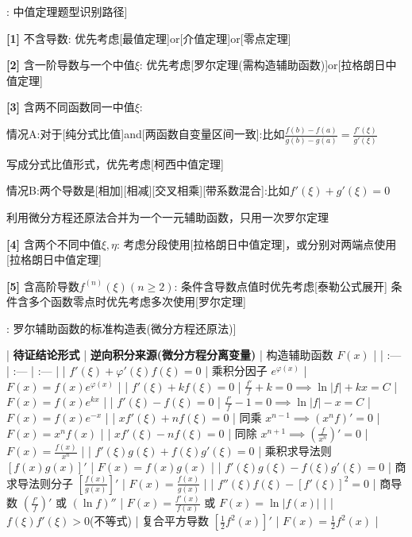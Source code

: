 \documentclass[11pt,a4paper,UTF8]{ctexart}
\begin{document}
\begin{thmbox}[原理[1]: 中值定理题型识别路径]

\textbf{[1]} 不含导数:		   优先考虑[最值定理]or[介值定理]or[零点定理]

\textbf{[2]} 含一阶导数与一个中值$\xi$:	优先考虑[罗尔定理(需构造辅助函数)]or[拉格朗日中值定理]

\textbf{[3]} 含两不同函数同一中值$\xi$:

情况A:对于[纯分式比值]and[两函数自变量区间一致]:比如$\frac{f(b)-f(a)}{g(b)-g(a)} = \frac{f'(\xi)}{g'(\xi)}$

  写成分式比值形式，优先考虑[柯西中值定理] 

情况B:两个导数是[相加][相减][交叉相乘][带系数混合]:比如$f'(\xi) + g'(\xi) = 0$

利用微分方程还原法合并为一个一元辅助函数，只用一次罗尔定理

\textbf{[4]} 含两个不同中值$\xi, \eta$:	   考虑分段使用[拉格朗日中值定理]，或分别对两端点使用[拉格朗日中值定理]

\textbf{[5]} 含高阶导数$f^{(n)}(\xi)(n \ge 2)$:     条件含导数点值时优先考虑[泰勒公式展开] 条件含多个函数零点时优先考虑多次使用[罗尔定理]

\end{thmbox}
\begin{thmbox}[原理[2]: 罗尔辅助函数的标准构造表(微分方程还原法)]

| \textbf{待证结论形式} | \textbf{逆向积分来源(微分方程分离变量)} | \textit{}构造辅助函数 $F(x)$\textit{} |
| :--- | :--- | :--- |
| $f'(\xi) + \varphi'(\xi)f(\xi) = 0$ | 乘积分因子 $e^{\varphi(x)}$ | $F(x) = f(x)e^{\varphi(x)}$ |
| $f'(\xi) + kf(\xi) = 0$ | $\frac{f'}{f} + k = 0 \implies \ln\vert{}f\vert{} + kx = C$ | $F(x) = f(x)e^{kx}$ |
| $f'(\xi) - f(\xi) = 0$ | $\frac{f'}{f} - 1 = 0 \implies \ln\vert{}f\vert{} - x = C$ | $F(x) = f(x)e^{-x}$ |
| $xf'(\xi) + nf(\xi) = 0$ | 同乘 $x^{n-1} \implies(x^n f)' = 0$ | $F(x) = x^n f(x)$ |
| $xf'(\xi) - nf(\xi) = 0$ | 同除 $x^{n+1} \implies \left(\frac{f}{x^n}\right)' = 0$ | $F(x) = \frac{f(x)}{x^n}$ |
| $f'(\xi)g(\xi) + f(\xi)g'(\xi) = 0$ | 乘积求导法则 $[f(x)g(x)]'$ | $F(x) = f(x)g(x)$ |
| $f'(\xi)g(\xi) - f(\xi)g'(\xi) = 0$ | 商求导法则分子 $\left[\frac{f(x)}{g(x)}\right]'$ | $F(x) = \frac{f(x)}{g(x)}$ |
| $f''(\xi)f(\xi) - [f'(\xi)]^2 = 0$ | 商导数 $\left(\frac{f'}{f}\right)'$ 或 $(\ln f)''$ | $F(x) = \frac{f'(x)}{f(x)}$ 或 $F(x) = \ln\vert{}f(x)\vert{}$ |
| $f(\xi)f'(\xi) > 0$(不等式) | 复合平方导数 $\left[\frac{1}{2}f^2(x)\right]'$ | $F(x) = \frac{1}{2}f^2(x)$ |

\end{thmbox}
\end{document}
